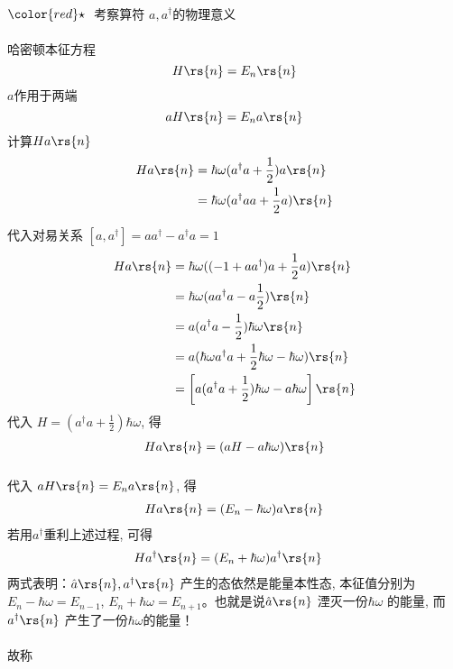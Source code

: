 \begin{frame} 
    \frametitle{}
    ~~\\ 
      ${\color{red}\star}~$ 考察算符 $a, a^\dagger$的物理意义\\
      ~~\\
  哈密顿本征方程
\[ H  \rs{n} = E_n  \rs{n}\]
 $a$作用于两端
\[aH  \rs{n} =E_n a \rs{n}\]
计算$H a \rs{n}$
\[
\begin{aligned}
      H a \rs{n} &=\hbar \omega (  a ^\dagger a + \frac{1}{2} )a \rs{n} \\ 
      &= \hbar \omega (   a ^\dagger a a  + \frac{1}{2} a ) \rs{n} \\ 
\end{aligned}
\]
\end{frame}

\begin{frame}
    代入对易关系  $ [a,a^\dagger] = a a^\dagger - a^\dagger a= 1$ 
    \[
    \begin{aligned}
          H a \rs{n} 
          &= \hbar \omega (   (-1+a a ^\dagger )a + \frac{1}{2} a ) \rs{n} \\ 
          &= \hbar \omega  (  a a ^\dagger a -  a \frac{1}{2} ) \rs{n} \\ 
  &= a( a ^\dagger a -  \frac{1}{2} )\hbar \omega \rs{n}  \\
  &=  a( \hbar \omega   a ^\dagger a +  \frac{1}{2}\hbar \omega  - \hbar \omega ) \rs{n} \\ 
  &=  \left[a(a ^\dagger a +  \frac{1}{2})\hbar \omega  - a \hbar \omega \right]  \rs{n} 
\end{aligned}
\]
代入 $ H = (a ^\dagger a +  \frac{1}{2})\hbar \omega $, 得
 \begin{equation}\label{eq:tmp}
 \begin{aligned}
    H a \rs{n}  
      &=  (aH - a \hbar \omega ) \rs{n} \\ 
\end{aligned}   
 \end{equation}   
\end{frame}

\begin{frame}[label=current]
  \frametitle{}
  代入 $ aH  \rs{n} =E_n a \rs{n}  $, 得
  \[ 
    \begin{aligned}
        H a \rs{n}  
          &=  (E_n -  \hbar \omega ) a\rs{n} \\ 
    \end{aligned}
    \]
    若用$a^\dagger$重利上述过程, 可得
    \[ 
        \begin{aligned}
          H a^\dagger \rs{n}  
              &=  (E_n +  \hbar \omega ) a^\dagger \rs{n} 
        \end{aligned}
        \]
两式表明：$\hat{a} \rs{n}, a^\dagger\rs{n}$ 产生的态依然是能量本性态, 本征值分别为 $E_n -  \hbar \omega = E_{n-1}$, $E_n + \hbar \omega = E_{n+1}$。也就是说$\hat{a} \rs{n} $ 湮灭一份$ \hbar \omega $ 的能量, 而$a^\dagger\rs{n}$ 产生了一份$ \hbar \omega $的能量！\\
~~\\ 
故称     
\end{frame} 

